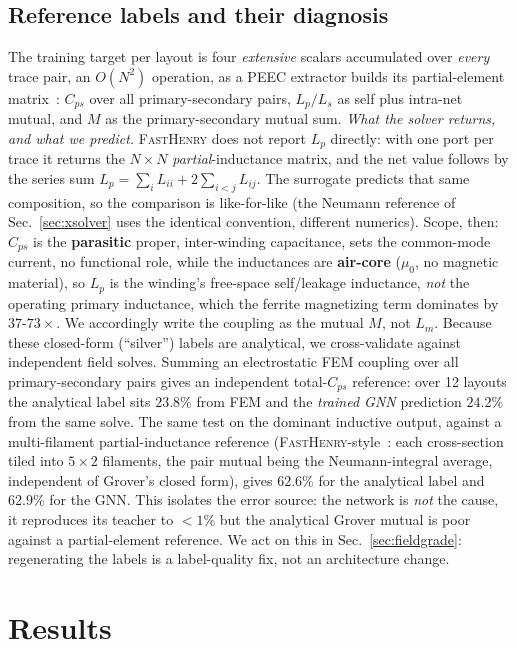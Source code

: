 \documentclass[letterpaper,twocolumn,9pt]{extarticle}
\begin{document}
\subsection{Reference labels and their diagnosis}
The training target per layout is four \emph{extensive} scalars accumulated over
\emph{every} trace pair, an $O(N^2)$ operation, as a PEEC extractor builds its
partial-element matrix~\cite{ruehli}: $C_{ps}$ over all primary-secondary pairs,
$L_p/L_s$ as self plus intra-net mutual, and $M$ as the primary-secondary
mutual sum. \emph{What the solver returns, and what we predict.} \textsc{FastHenry}
does not report $L_p$ directly: with one port per trace it returns the
$N\!\times\!N$ \emph{partial}-inductance matrix, and the net value follows by the
series sum $L_p=\sum_i L_{ii}+2\sum_{i<j}L_{ij}$. The surrogate predicts that same
composition, so the comparison is like-for-like (the Neumann reference of
Sec.~\ref{sec:xsolver} uses the identical convention, different numerics). Scope,
then: $C_{ps}$ is the \textbf{parasitic} proper, inter-winding capacitance,
sets the common-mode current, no functional role, while the inductances are
\textbf{air-core} ($\mu_0$, no magnetic material), so $L_p$ is the winding's
free-space self/leakage inductance, \emph{not} the operating primary inductance,
which the ferrite magnetizing term dominates by $37$-$73\times$. We accordingly
write the coupling as the mutual $M$, not $L_m$. Because
these closed-form (``silver'') labels are analytical, we
cross-validate against independent field solves. Summing an electrostatic FEM
coupling over all primary-secondary pairs gives an independent total-$C_{ps}$
reference: over 12 layouts the analytical label sits $23.8\%$ from FEM and the
\emph{trained GNN} prediction $24.2\%$ from the same solve. The same test on the
dominant inductive output, against a multi-filament partial-inductance reference
(\textsc{FastHenry}-style~\cite{fasthenry}: each cross-section tiled into
$5\!\times\!2$ filaments, the pair mutual being the Neumann-integral average,
independent of Grover's closed form), gives $62.6\%$ for the analytical label and
$62.9\%$ for the GNN. This isolates the error source: the network is \emph{not}
the cause, it reproduces its teacher to $<\!1\%$ but the analytical Grover
mutual is poor against a partial-element reference. We act on this in
Sec.~\ref{sec:fieldgrade}: regenerating the labels is a label-quality fix, not an
architecture change.

\section{Results}
\end{document}

